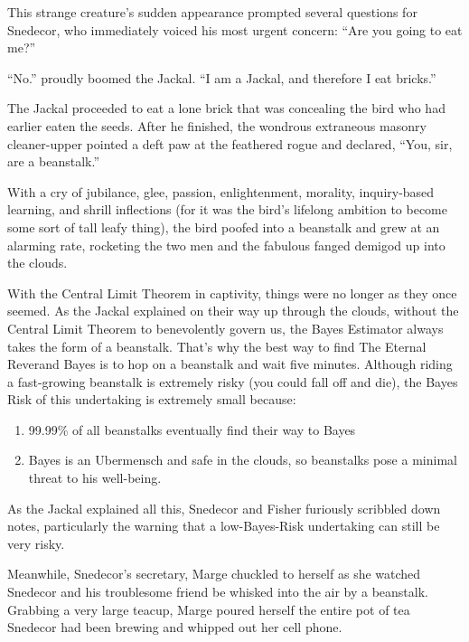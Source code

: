 \documentclass{article}
\begin{document}
This strange creature's sudden appearance prompted several questions for Snedecor, who immediately voiced his most urgent concern: ``Are you going to eat me?'' \newline

``No.'' proudly boomed the Jackal. ``I am a Jackal, and therefore I eat bricks.'' \newline

The Jackal proceeded to eat a lone brick that was concealing the bird who had earlier eaten the seeds. After he finished, the wondrous extraneous masonry cleaner-upper pointed a deft paw at the feathered rogue and declared, ``You, sir, are a beanstalk.'' \newline

With a cry of jubilance, glee, passion, enlightenment, morality, inquiry-based learning, and shrill inflections (for it was the bird's lifelong ambition to become some sort of tall leafy thing), the bird poofed into a beanstalk and grew at an alarming rate, rocketing the two men and the fabulous fanged demigod up into the clouds. \newline

With the Central Limit Theorem in captivity, things were no longer as they once seemed. As the Jackal explained on their way up through the clouds, without the Central Limit Theorem to benevolently govern us, the Bayes Estimator always takes the form of a beanstalk. That's why the best way to find The Eternal Reverand Bayes is to hop on a beanstalk and wait five minutes. Although riding a fast-growing beanstalk is extremely risky (you could fall off and die), the Bayes Risk of this undertaking is extremely small because:

\begin{enumerate}
\item 99.99\% of all beanstalks eventually find their way to Bayes
\item Bayes is an Ubermensch and safe in the clouds, so beanstalks pose a minimal threat to his well-being.
\end{enumerate}
As the Jackal explained all this, Snedecor and Fisher furiously scribbled down notes, particularly the warning that a low-Bayes-Risk undertaking can still be very risky.



Meanwhile, Snedecor's secretary, Marge chuckled to herself as she watched Snedecor and his troublesome friend be whisked into the air by a beanstalk. Grabbing a very large teacup, Marge poured herself the entire pot of tea Snedecor had been brewing and whipped out her cell phone. 
\end{document}
